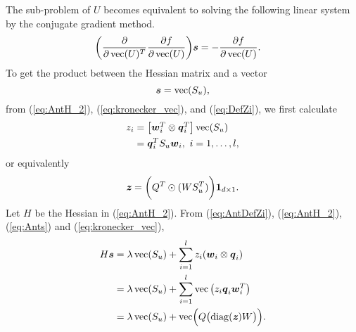 The sub-problem of $U$ becomes equivalent to solving the following linear system by the conjugate gradient method.
\begin{align}
\biggl(\frac{\partial }{\partial \operatorname*{vec}(U)^T} \frac{\partial f}{\partial \operatorname*{vec}(U)} \biggr)\boldsymbol{s}
&= - \frac{\partial f}{\partial \operatorname*{vec}(U)}
\label{eq:AntHsG}.
\end{align}
To get the product between the Hessian matrix and a vector 
\begin{equation}
\boldsymbol{s} = \operatorname*{vec}(S_u), 
\label{eq:Ants}
\end{equation}
from (\ref{eq:AntH_2}), (\ref{eq:kronecker_vec}), and (\ref{eq:DefZi}), we first calculate
\begin{equation}
\begin{aligned}
    z_i 
    &=\begin{bmatrix} \boldsymbol{w}_i^T\otimes\boldsymbol{q}_i^T \end{bmatrix}\operatorname*{vec}(S_u)\\
    &=\boldsymbol{q}_i^T S_u \boldsymbol{w}_i , \text{ }i=1,\dots,l
    \label{eq:AntDefZi},
\end{aligned}
\end{equation}
or equivalently
\begin{equation}
    \textbf{\textit{z}} = \biggl({Q^T}\odot{(WS_u^T)}\biggr) \boldsymbol{1}_{d\times 1}
    \label{eq:AntCalcZ}.
\end{equation}
Let $H$ be the Hessian in (\ref{eq:AntH_2}). From (\ref{eq:AntDefZi}), (\ref{eq:AntH_2}), (\ref{eq:Ants}) and  (\ref{eq:kronecker_vec}),
\begin{align}
    H \boldsymbol{s}         
                  &= \lambda \operatorname*{vec}(S_u) + \sum_{i=1}^l z_i (\boldsymbol{w}_i\otimes \boldsymbol{q}_i) \nonumber \\
                  &= \lambda \operatorname*{vec}(S_u) +  \sum_{i=1}^l \operatorname*{vec}\left(z_i \boldsymbol{q}_i \boldsymbol{w}_i^T\right)  \nonumber  \\
                  &= \lambda \operatorname*{vec}(S_u) +  \operatorname*{vec} \Bigl ( Q \bigl(\operatorname*{diag}(\textbf{\textit{z}}) W \bigr) \Bigr) \label{eq:AntHv}.
\end{align}
